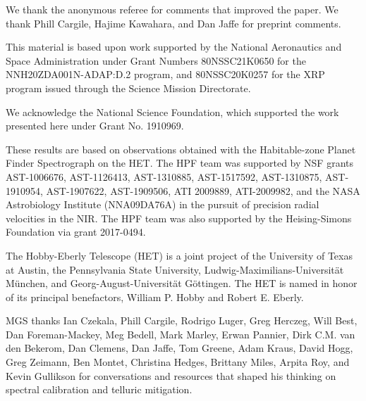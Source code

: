 \documentclass[twocolumn]{aastex631}
\begin{document}
\begin{acknowledgments}
    \footnotesize{
        We thank the anonymous referee for comments that improved the paper.  We thank Phill Cargile, Hajime Kawahara, and Dan Jaffe for preprint comments.

        This material is based upon work supported by the National Aeronautics and Space Administration under Grant Numbers 80NSSC21K0650 for the NNH20ZDA001N-ADAP:D.2 program,
        and 80NSSC20K0257 for the XRP program issued through the Science Mission Directorate.

        We acknowledge the National Science Foundation, which supported the work presented here under Grant No. 1910969.

        These results are based on observations obtained with the Habitable-zone Planet Finder Spectrograph on the HET. The HPF team was supported by NSF grants AST-1006676, AST-1126413, AST-1310885, AST-1517592, AST-1310875, AST-1910954, AST-1907622, AST-1909506, ATI 2009889, ATI-2009982, and the NASA Astrobiology Institute (NNA09DA76A) in the pursuit of precision radial velocities in the NIR. The HPF team was also supported by the Heising-Simons Foundation via grant 2017-0494.

        The Hobby-Eberly Telescope (HET) is a joint project of the University of Texas at Austin, the Pennsylvania State University, Ludwig-Maximilians-Universit\"at M\"unchen, and Georg-August-Universit\"at G\"ottingen. The HET is named in honor of its principal benefactors, William P. Hobby and Robert E. Eberly.

        MGS thanks Ian Czekala, Phill Cargile, Rodrigo Luger, Greg Herczeg, Will Best, Dan Foreman-Mackey, Meg Bedell, Mark Marley, Erwan Pannier, Dirk C.M. van den Bekerom, Dan Clemens, Dan Jaffe, Tom Greene, Adam Kraus, David Hogg, Greg Zeimann, Ben Montet, Christina Hedges, Brittany Miles, Arpita Roy, and Kevin Gullikson for conversations and resources that shaped his thinking on spectral calibration and telluric mitigation.
    }
\end{acknowledgments}



\end{document}
